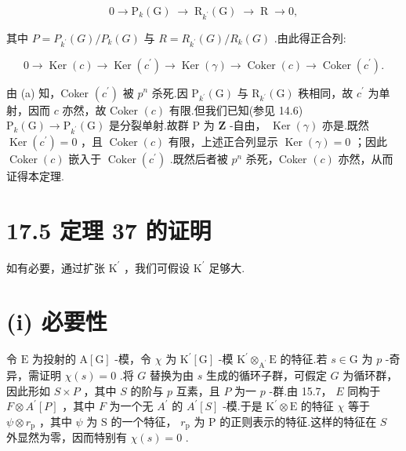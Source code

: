 \documentclass[10pt]{article}
\begin{document}
\[
0 \rightarrow  {\mathrm{P}}_{k}\left( \mathrm{G}\right) \; \rightarrow  \;{\mathrm{R}}_{{k}^{\prime }}\left( \mathrm{G}\right) \; \rightarrow  \;\mathrm{R}\; \rightarrow  0,
\]

其中 \(P = {P}_{{k}^{\prime }}\left( G\right) /{P}_{k}\left( G\right)\) 与 \(R = {R}_{{k}^{\prime }}\left( G\right) /{R}_{k}\left( G\right)\) .由此得正合列:

\[
0 \rightarrow  \operatorname{Ker}\left( c\right)  \rightarrow  \operatorname{Ker}\left( {c}^{\prime }\right)  \rightarrow  \operatorname{Ker}\left( \gamma \right)  \rightarrow  \operatorname{Coker}\left( c\right)  \rightarrow  \operatorname{Coker}\left( {c}^{\prime }\right) .
\]

由 (a) 知，Coker \(\left( {c}^{\prime }\right)\) 被 \({p}^{n}\) 杀死.因 \({\mathrm{P}}_{{k}^{\prime }}\left( \mathrm{G}\right)\) 与 \({\mathrm{R}}_{{k}^{\prime }}\left( \mathrm{G}\right)\) 秩相同，故 \({c}^{\prime }\) 为单射，因而 \(c\) 亦然，故 Coker \(\left( c\right)\) 有限.但我们已知(参见 14.6) \({\mathrm{P}}_{k}\left( \mathrm{G}\right)  \rightarrow  {\mathrm{P}}_{{k}^{\prime }}\left( \mathrm{G}\right)\) 是分裂单射.故群 \(\mathrm{P}\) 为 \(\mathbf{Z}\) -自由， \(\operatorname{Ker}\left( \gamma \right)\) 亦是.既然 \(\operatorname{Ker}\left( {c}^{\prime }\right)  = 0\) ，且 \(\operatorname{Coker}\left( c\right)\) 有限，上述正合列显示 \(\operatorname{Ker}\left( \gamma \right)  = 0\) ；因此 \(\operatorname{Coker}\left( c\right)\) 嵌入于 \(\operatorname{Coker}\left( {c}^{\prime }\right)\) .既然后者被 \({p}^{n}\) 杀死，Coker \(\left( c\right)\) 亦然，从而证得本定理.

\section*{17.5 定理 37 的证明}

如有必要，通过扩张 \({\mathrm{K}}^{\prime }\) ，我们可假设 \({\mathrm{K}}^{\prime }\) 足够大.

\section*{(i) 必要性}

令 \(\mathrm{E}\) 为投射的 \(\mathrm{A}\left\lbrack  \mathrm{G}\right\rbrack\) -模，令 \(\chi\) 为 \({\mathrm{K}}^{\prime }\left\lbrack  \mathrm{G}\right\rbrack\) -模 \({\mathrm{K}}^{\prime }{ \otimes  }_{{\mathrm{A}}^{\prime }}\mathrm{E}\) 的特征.若 \(s \in  \mathrm{G}\) 为 \(p\) -奇异，需证明 \(\chi \left( s\right)  = 0\) .将 \(G\) 替换为由 \(s\) 生成的循环子群，可假定 \(G\) 为循环群，因此形如 \(S \times  P\) ，其中 \(S\) 的阶与 \(p\) 互素，且 \(P\) 为一 \(p\) -群.由 15.7， \(E\) 同构于 \(F \otimes  {A}^{\prime }\left\lbrack  P\right\rbrack\) ，其中 \(F\) 为一个无 \({A}^{\prime }\) 的 \({A}^{\prime }\left\lbrack  S\right\rbrack\) -模.于是 \({\mathrm{K}}^{\prime } \otimes  \mathrm{E}\) 的特征 \(\chi\) 等于 \(\psi  \otimes  {r}_{\mathrm{p}}\) ，其中 \(\psi\) 为 \(\mathrm{S}\) 的一个特征， \({r}_{\mathrm{p}}\) 为 \(\mathrm{P}\) 的正则表示的特征.这样的特征在 \(S\) 外显然为零，因而特别有 \(\chi \left( s\right)  = 0\) .
\end{document}
